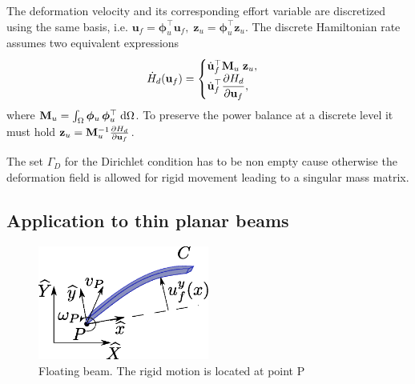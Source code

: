 \documentclass{svjour3}                     %
\begin{document}
The deformation velocity and its corresponding effort variable are discretized using the same basis, i.e. $\bm{u}_f = \bm{\phi}_u^\top \mathbf{u}_f, \; \bm{z}_u = \bm{\phi}_u^\top \mathbf{z}_u$. The discrete Hamiltonian rate assumes two equivalent expressions
\begin{equation*}
\dot{H}_d(\mathbf{u}_f) = 
\begin{cases}
\dot{\mathbf{u}}_f^\top \mathbf{M}_u \; \mathbf{z}_u, \\
\displaystyle \dot{\mathbf{u}}_f^\top \diffp{H_d}{\mathbf{u}_f},
\end{cases}
\end{equation*}
where $\mathbf{M}_u=\int_{\Omega} \bm{\phi}_u \, \bm{\phi}_u^\top \d{\Omega}$. To preserve the power balance at a discrete level it must hold $ \mathbf{z}_u = \mathbf{M}_u^{-1} \diffp{H_d}{\mathbf{u}_f}$. \\

\begin{remark}\label{rmk:dirich}
	The set $\Gamma_D$ for the Dirichlet condition has to be non empty cause otherwise the deformation field is allowed for rigid movement leading to a singular mass matrix. 
\end{remark}

\subsection{Application to thin planar beams}
\label{sec:ph_floatbeam}

\begin{figure}[t]
	\centering
	\includegraphics[width=0.5\textwidth]{beam.eps} 
	\caption{Floating beam. The rigid motion is located at point P}
	\label{fig:beam}
\end{figure}
\end{document}
